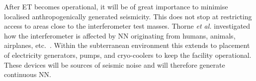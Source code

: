 After ET becomes operational, it will be of great importance to minimise localised anthropogenically generated seismicity. This does not stop at restricting access to areas close to the interferometer test masses. Thorne \emph{et al.} investigated how the interferometer is affected by NN originating from humans, animals, airplanes, etc.~\cite{GGthorneWinstein}. Within the subterranean environment this extends to placement of electricity generators, pumps, and cryo-coolers to keep the facility operational. These devices will be sources of seismic noise and will therefore generate continuous NN. 





